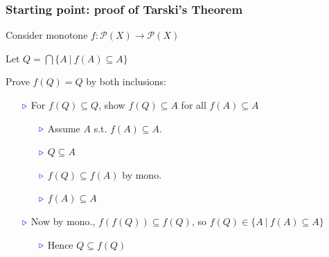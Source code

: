 \documentclass[11pt]{beamer}
\newcommand{\myb}[0]{\ensuremath{\textcolor{blue}{\triangleright}}}
\begin{document}
\begin{frame}
  \frametitle{Starting point: proof of Tarski's Theorem}

  Consider monotone $f : \mathcal{P}(X) \to \mathcal{P}(X)$

\vspace{.2cm}

  Let $Q = \bigcap\{ A\ |\ f(A) \subseteq A\}$

\vspace{.2cm}

  Prove $f(Q) = Q$ by both inclusions:

  \begin{enumerate}
  \item[$\myb$] For $f(Q)\subseteq Q$, show $f(Q) \subseteq A$ for all $f(A) \subseteq A$
    \begin{itemize}
    \item[$\myb$] Assume $A$ s.t. $f(A) \subseteq A$.
    \item[$\myb$] $Q\subseteq A$
    \item[$\myb$] $f(Q)\subseteq f(A)$ by mono.
    \item[$\myb$] $f(A) \subseteq A$
    \end{itemize}

\vspace{.1cm}

  \item[$\myb$] Now by mono., $f(f(Q))\subseteq f(Q)$, so $f(Q)\in\{A\ |\ f(A)\subseteq A\}$
    \begin{itemize}
    \item[$\myb$] Hence $Q\subseteq f(Q)$
      \end{itemize}
  \end{enumerate}
  \end{frame}
    
\end{document}
